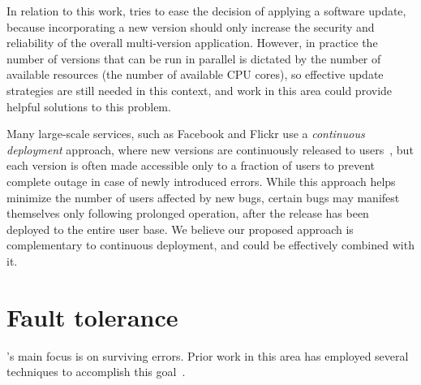 
In relation to this work, \mx tries to ease the decision of applying a software
update, because incorporating a new version should only increase the security
and reliability of the overall multi-version application.  However, in practice
the number of versions that can be run in parallel is dictated by the number of
available resources (\eg the number of available CPU cores), so effective
update strategies are still needed in this context, and work in this area could
provide helpful solutions to this problem.


Many large-scale services, such as Facebook and Flickr use a {\it continuous
deployment} approach, where new versions are continuously released to
users~\cite{johnson2009,flickr}, but each version is often made accessible only
to a fraction of users to prevent complete outage in case of newly introduced
errors.  While this approach helps minimize the number of users affected by new
bugs, certain bugs may manifest themselves only following prolonged operation,
after the release has been deployed to the entire user base.  We believe our
proposed approach is complementary to continuous deployment, and could be
effectively combined with it.

\section{Fault tolerance}

\mx's main focus is on surviving errors. Prior work in this area has employed
several techniques to accomplish this
goal~\cite{rx,compl-schedules11,fo,exec-trans06,vigilante,clearview,microreboots}.

